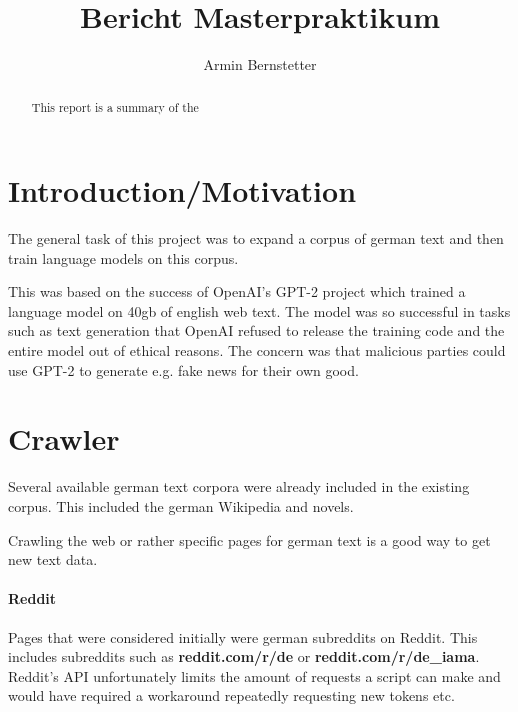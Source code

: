 \documentclass[sigconf,natbib=false]{acmart}
\begin{document}

\title{Bericht Masterpraktikum}

\author{Armin Bernstetter}


\begin{abstract}
This report is a summary of the 
\end{abstract}



\maketitle

\section{Introduction/Motivation}

The general task of this project was to expand a corpus of german text and then train language models on this corpus.

This was based on the success of OpenAI's GPT-2 project which trained a language model on 40gb of english web text. The model was so successful in tasks such as text generation that OpenAI refused to release the training code and the entire model out of ethical reasons. The concern was that malicious parties could use GPT-2 to generate e.g. fake news for their own good.


\section{Crawler}

Several available german text corpora were already included in the existing corpus. This included the german Wikipedia and novels. 

Crawling the web or rather specific pages for german text is a good way to get new text data.


\paragraph{Reddit}
Pages that were considered initially were german subreddits on Reddit. This includes subreddits such as \textbf{reddit.com/r/de} or \textbf{reddit.com/r/de\_iama}. Reddit's API unfortunately limits the amount of requests a script can make and would have required a workaround repeatedly requesting new tokens etc.
\end{document}
